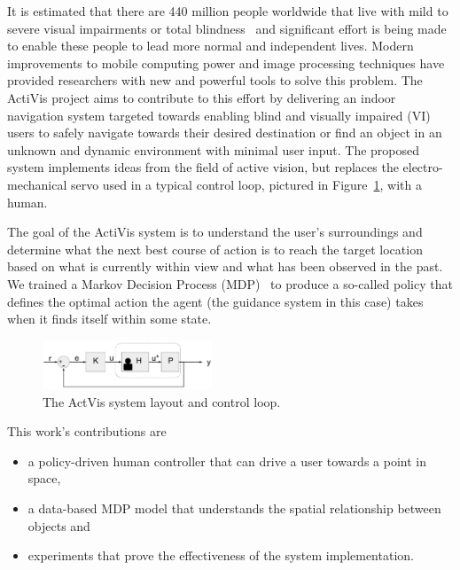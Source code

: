\documentclass[a4paper, twoside]{article}
\begin{document}
\noindent It is estimated that there are 440 million people worldwide that live with mild to severe visual impairments or total blindness~\cite{bourne2017magnitude} and significant effort is being made to enable these people to lead more normal and independent lives. Modern improvements to mobile computing power and image processing techniques have provided researchers with new and powerful tools to solve this problem. The ActiVis project aims to contribute to this effort by delivering an indoor navigation system targeted towards enabling blind and visually impaired (VI) users to safely navigate towards their desired destination or find an object in an unknown and dynamic environment with minimal user input. The proposed system implements ideas from the field of active vision, but replaces the electro-mechanical servo used in a typical control loop, pictured in Figure~\ref{fig:control-loop}, with a human. %

The goal of the ActiVis system is to understand the user's surroundings and determine what the next best course of action is to reach the target location based on what is currently within view and what has been observed in the past. We trained a Markov Decision Process (MDP)~\cite{bellman1957markovian} to produce a so-called policy that defines the optimal action the agent (the guidance system in this case) takes when it finds itself within some state.  

\begin{figure}
  \centering
  \includegraphics[width=0.45\textwidth]{figures/control_loop.png}
  \caption{The ActVis system layout and control loop. }\label{fig:control-loop}
\end{figure}

This work's contributions are 

\begin{itemize}
  \item a policy-driven human controller that can drive a user towards a point in space,
  \item a data-based MDP model that understands the spatial relationship between objects and
  \item experiments that prove the effectiveness of the system implementation.
\end{itemize}
\end{document}
